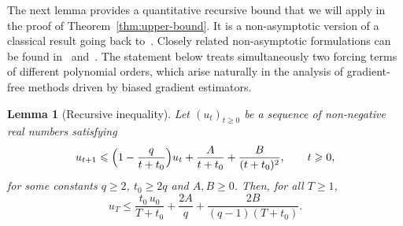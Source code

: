\documentclass{article}
\newtheorem{lemma}{Lemma}[section]
\renewcommand{\leq}{\leqslant}
\renewcommand{\geq}{\geqslant}
\theoremstyle{definition}
\begin{document}
\medskip
The next lemma provides a quantitative recursive bound that we will 
apply in the proof of Theorem~\ref{thm:upper-bound}. It is a 
non-asymptotic version of a classical result going back 
to~\citet{chung1954stochastic}. Closely related non-asymptotic 
formulations can be found in~\citet{moulines2011non} 
and~\citet{jiang2024generalized}. The statement below treats 
simultaneously two forcing terms of different polynomial orders, 
which arise naturally in the analysis of gradient-free methods 
driven by biased gradient estimators.

\begin{lemma}[Recursive inequality]
\label{lem:recursion}
Let $(u_t)_{t\geq 0}$ be a sequence of non-negative real numbers 
satisfying
\begin{equation}
\label{eq:recursion-hypo}
u_{t+1}\leq\Bigl(1-\frac{q}{t+t_0}\Bigr)u_t
+\frac{A}{t+t_0}+\frac{B}{(t+t_0)^2},\qquad t\geq 0,
\end{equation}
for some constants $q\geq 2$, $t_0\geq 2q$ and $A,B\geq 0$. Then, 
for all $T\geq 1$,
\begin{equation}
\label{eq:recursion-conclusion}
u_T\leq\frac{t_0\,u_0}{T+t_0}+\frac{2A}{q}
+\frac{2B}{(q-1)(T+t_0)}.
\end{equation}
\end{lemma}
\end{document}
